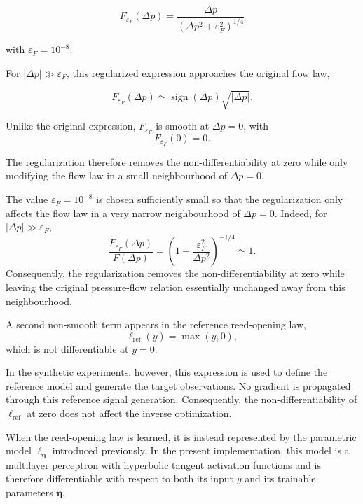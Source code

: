 \documentclass[11pt,a4paper]{report}
\theoremstyle{plain}
\theoremstyle{definition}
\begin{document}
\begin{equation}
\boxed{
F_{\varepsilon_F}(\Delta p)
=
\frac{\Delta p}
{\left(\Delta p^2+\varepsilon_F^2\right)^{1/4}}
}
\label{eq:regularized_flow_function}
\end{equation}

with $\varepsilon_F=10^{-8}$.

For $|\Delta p|\gg\varepsilon_F$, this regularized expression approaches the
original flow law,

\begin{equation}
F_{\varepsilon_F}(\Delta p)
\simeq
\operatorname{sign}(\Delta p)\sqrt{|\Delta p|}.
\end{equation}

Unlike the original expression, $F_{\varepsilon_F}$ is smooth at
$\Delta p=0$, with
\begin{equation}
F_{\varepsilon_F}(0)=0.
\end{equation}

The regularization therefore removes the non-differentiability at zero while
only modifying the flow law in a small neighbourhood of
$\Delta p=0$.

The value $\varepsilon_F=10^{-8}$ is chosen sufficiently small so that the
regularization only affects the flow law in a very narrow neighbourhood of
$\Delta p=0$. Indeed, for $|\Delta p|\gg\varepsilon_F$,
\[
\frac{F_{\varepsilon_F}(\Delta p)}{F(\Delta p)}
=
\left(
1+\frac{\varepsilon_F^2}{\Delta p^2}
\right)^{-1/4}
\simeq 1.
\]
Consequently, the regularization removes the non-differentiability at zero
while leaving the original pressure-flow relation essentially unchanged away
from this neighbourhood.

A second non-smooth term appears in the reference reed-opening law,
\begin{equation}
\ell_{\mathrm{ref}}(y)=\max(y,0),
\end{equation}
which is not differentiable at \(y=0\).

In the synthetic experiments, however, this expression is used to define the
reference model and generate the target observations. No gradient is propagated
through this reference signal generation. Consequently, the non-differentiability
of \(\ell_{\mathrm{ref}}\) at zero does not affect the inverse optimization.

When the reed-opening law is learned, it is instead represented by the
parametric model \(\ell_{\boldsymbol{\eta}}\) introduced previously. In the
present implementation, this model is a multilayer perceptron with hyperbolic
tangent activation functions and is therefore differentiable with respect to
both its input \(y\) and its trainable parameters
\(\boldsymbol{\eta}\).
\end{document}
